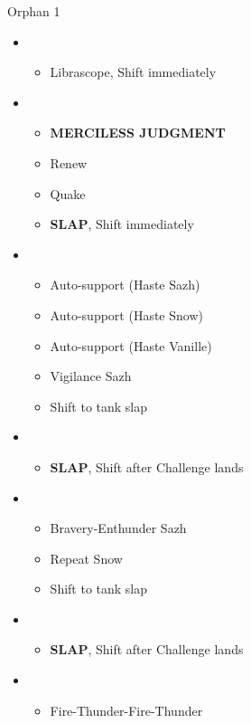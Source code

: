 \begin{battle}{Orphan 1}
\begin{multicols}{2}
\begin{itemize}
    \item \second
    \begin{itemize}
        \item Librascope, Shift immediately
    \end{itemize}
    \item \third
    \begin{itemize}
        \item \textbf{MERCILESS JUDGMENT}
        \item Renew
        \item Quake
        \item \textbf{SLAP}, Shift immediately
    \end{itemize}
    \item \fourth
    \begin{itemize}
        \item Auto-support (Haste Sazh)
        \item Auto-support (Haste Snow)
        \item Auto-support (Haste Vanille)
        \item Vigilance Sazh
        \item Shift to tank slap
    \end{itemize}
    \item \third
    \begin{itemize}
        \item \textbf{SLAP}, Shift after Challenge lands
    \end{itemize}
    \item \fourth
    \begin{itemize}
        \item Bravery-Enthunder Sazh
        \item Repeat Snow
        \item Shift to tank slap
    \end{itemize}
    \item \third
    \begin{itemize}
        \item \textbf{SLAP}, Shift after Challenge lands
    \end{itemize}
    \item \fifth
    \begin{itemize}
        \item Fire-Thunder-Fire-Thunder

\end{itemize}
\end{itemize}
\end{multicols}
\end{battle}
